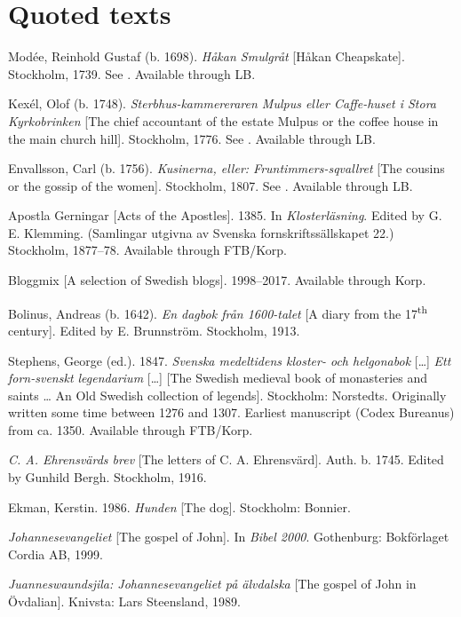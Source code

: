 \documentclass[output=paper]{langscibook}
\begin{document}
\section*{Quoted texts}
\begin{description}[font=\normalfont]\sloppy
\item[1dSMUL:] Modée, Reinhold Gustaf (b. 1698). \textit{Håkan Smulgråt} [Håkan Cheapskate]. Stockholm, 1739. See  \citet{MarttalaStromquist2001}. Available through LB.
\item[2aSTERBH:] Kexél, Olof (b. 1748). \textit{Sterbhus-kammereraren Mulpus eller Caffe-huset i Stora Kyrkobrinken} [The chief accountant of the estate Mulpus or the coffee house in the main church hill]. Stockholm, 1776. See \citet{MarttalaStromquist2001}. Available through LB.
\item[2cKUSINE:] Envallsson, Carl (b. 1756). \textit{Kusinerna, eller: Fruntimmers-sqvallret} [The cousins or the gossip of the women]. Stockholm, 1807. See \citet{MarttalaStromquist2001}. Available through LB.
\item[ApG:] Apostla Gerningar [Acts of the Apostles]. 1385. In \textit{Klosterläsning}. Edited by G. E. Klemming. (Samlingar utgivna av Svenska fornskriftssällskapet 22.) Stockholm, 1877–78. Available through FTB/Korp.
\item[Blogg:] Bloggmix [A selection of Swedish blogs]. 1998–2017. Available through Korp.
\item[Bol:] Bolinus, Andreas (b. 1642). \textit{En dagbok från 1600-talet} [A diary from the 17\textsuperscript{th} century]. Edited by E. Brunnström. Stockholm, 1913. 
\item[Leg:] Stephens, George (ed.). 1847. \textit{Svenska medeltidens kloster- och helgonabok} […] \textit{Ett forn-svenskt legendarium} […] [The Swedish medieval book of monasteries and saints … An Old Swedish collection of legends]. Stockholm: Norstedts. Originally written some time between 1276 and 1307. Earliest manuscript (Codex Bureanus) from ca. 1350. Available through FTB/Korp.
\item[Ehrensvärd:] \textit{C. A. Ehrensvärds brev} [The letters of C. A. Ehrensvärd]. Auth. b. 1745. Edited by Gunhild Bergh. Stockholm, 1916.
\item[Hunden:] Ekman, Kerstin. 1986. \textit{Hunden} [The dog]. Stockholm: Bonnier. 
\item[Joh.:] \textit{Johannesevangeliet} [The gospel of John]. In \textit{Bibel 2000}. Gothenburg: Bokförlaget Cordia AB, 1999. 
\item[Jua.:] \textit{Juanneswaundsjila: Johannesevangeliet på älvdalska} [The gospel of John in Övdalian]. Knivsta: Lars Steensland, 1989.

\end{description}
\end{document}
